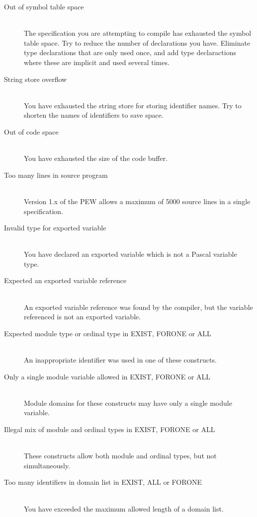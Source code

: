 \begin{description}
\item[Out of symbol table space]\mbox{}\\
The specification you are attempting to compile has exhausted the
symbol table space. Try to reduce the number of declarations you
have. Eliminate type declarations that are only used once, and add
type declaractions where these are implicit and used several times.

\item[String store overflow]\mbox{}\\
You have exhausted the string store for storing identifier names.
Try to shorten the names of identifiers to save space.

\item[Out of code space]\mbox{}\\
You have exhausted the size of the code buffer.

\item[Too many lines in source program]\mbox{}\\
Version 1.x of the PEW allows a maximum of 5000 source lines in
a single specification.

\item[Invalid type for exported variable]\mbox{}\\
You have declared an exported variable which is not a Pascal
variable type.

\item[Expected an exported variable reference]\mbox{}\\
An exported variable reference was found by the compiler, but the
variable referenced is not an exported variable.

\item[Expected module type or ordinal type in EXIST, FORONE or ALL]\mbox{}\\
An inappropriate identifier was used in one of these constructs.

\item[Only a single module variable allowed in EXIST, FORONE or ALL]\mbox{}\\
Module domains for these constructs may have only a single module
variable.

\item[Illegal mix of module and ordinal types in EXIST, FORONE or ALL]\mbox{}\\
These constructs allow both module and ordinal types, but not
simultaneously.

\item[Too many identifiers in domain list in EXIST, ALL or FORONE]\mbox{}\\
You have exceeded the maximum allowed length of a domain list.


\end{description}
